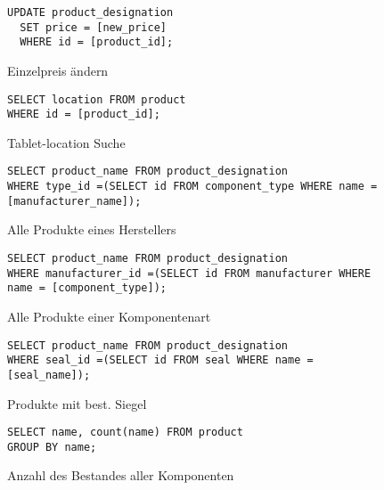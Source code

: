 \documentclass{article}
\begin{document}
\begin{figure}[!h]
\caption{Einzelpreis ändern}
\begin{lstlisting}
UPDATE product_designation
  SET price = [new_price]
  WHERE id = [product_id];
\end{lstlisting}
\end{figure}
\begin{figure}[!h]
\caption{Tablet-location Suche}
\begin{lstlisting}
SELECT location FROM product
WHERE id = [product_id];
\end{lstlisting}
\end{figure}
\begin{figure}[!h]
\caption{Alle Produkte eines Herstellers}
\begin{lstlisting}
SELECT product_name FROM product_designation
WHERE type_id =(SELECT id FROM component_type WHERE name = [manufacturer_name]);
\end{lstlisting}
\end{figure}
\begin{figure}[!h]
\caption{Alle Produkte einer Komponentenart}
\begin{lstlisting}
SELECT product_name FROM product_designation
WHERE manufacturer_id =(SELECT id FROM manufacturer WHERE name = [component_type]);
\end{lstlisting}
\end{figure}
\begin{figure}[!h]
\caption{Produkte mit best. Siegel}
\begin{lstlisting}
SELECT product_name FROM product_designation
WHERE seal_id =(SELECT id FROM seal WHERE name = [seal_name]);
\end{lstlisting}
\end{figure}
\begin{figure}[!h]
\caption{Anzahl des Bestandes aller Komponenten}
\begin{lstlisting}
SELECT name, count(name) FROM product 
GROUP BY name;
\end{lstlisting}
\end{figure}
\end{document}
